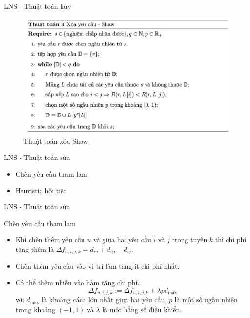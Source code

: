 \begin{frame}{LNS - Thuật toán hủy}
  \begin{figure}[H] %
    \centering %
    \includegraphics[width=1\textwidth]{figures/des_shaw.png} 
    \caption{Thuật toán xóa Shaw} 
    \label{fig:shaw_pseudo}
  \end{figure} 
\end{frame}

\begin{frame}{LNS - Thuật toán sửa}
  \begin{itemize}
    \item Chèn yêu cầu tham lam
    \item Heuristic hối tiếc
  \end{itemize}  
\end{frame}

\begin{frame}{LNS - Thuật toán sửa}
  \begin{block}{Chèn yêu cầu tham lam}
    \begin{itemize}
      \item Khi chèn thêm yêu cầu $u$ và giữa hai yêu cầu $i$ và $j$ trong tuyến $k$ thì chi phí tăng thêm là $\Delta f_{u, i, j, k} = d_{iu} + d_{uj} - d_{ij}$.
      \item Chèn thêm yêu cầu vào vị trí làm tăng ít chi phí nhất.
      \item Có thể thêm nhiễu vào hàm tăng chi phí.
      \begin{equation}
        \Delta f_{u, i, j, k} := \Delta f_{u, i, j, k} + \lambda p d_{\text{max}}
      \end{equation}
      với $d_{\text{max}}$ là khoảng cách lớn nhất giữa hai yêu cầu, $p$ là một số ngẫu nhiên trong khoảng $(-1,1)$ và $\lambda$ là một hằng số điều khiển.
    \end{itemize}
  \end{block}
\end{frame}

